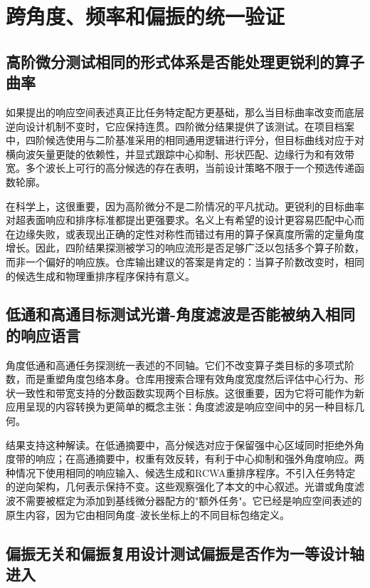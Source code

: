 \section{跨角度、频率和偏振的统一验证}

\subsection{高阶微分测试相同的形式体系是否能处理更锐利的算子曲率}

如果提出的响应空间表述真正比任务特定配方更基础，那么当目标曲率改变而底层逆向设计机制不变时，它应保持连贯。四阶微分结果提供了该测试。在项目档案中，四阶候选使用与二阶基准采用的相同通用逻辑进行评分，但目标曲线对应于对横向波矢量更陡的依赖性，并显式跟踪中心抑制、形状匹配、边缘行为和有效带宽。多个波长上可行的高分候选的存在表明，当前设计策略不限于一个预选传递函数轮廓。

在科学上，这很重要，因为高阶微分不是二阶情况的平凡扰动。更锐利的目标曲率对超表面响应和排序标准都提出更强要求。名义上有希望的设计更容易匹配中心而在边缘失败，或表现出正确的定性对称性而错过有用的算子保真度所需的定量角度增长。因此，四阶结果探测被学习的响应流形是否足够广泛以包括多个算子阶数，而非一个偏好的响应族。仓库输出建议的答案是肯定的：当算子阶数改变时，相同的候选生成和物理重排序程序保持有意义。

\subsection{低通和高通目标测试光谱-角度滤波是否能被纳入相同的响应语言}

角度低通和高通任务探测统一表述的不同轴。它们不改变算子类目标的多项式阶数，而是重塑角度包络本身。仓库用搜索合理有效角度宽度然后评估中心行为、形状一致性和带宽支持的分数函数实现两个目标族。这很重要，因为它将可能作为新应用呈现的内容转换为更简单的概念主张：角度滤波是响应空间中的另一种目标几何。

结果支持这种解读。在低通摘要中，高分候选对应于保留强中心区域同时拒绝外角度带的响应；在高通摘要中，权重有效反转，有利于中心抑制和强外角度响应。两种情况下使用相同的响应输入、候选生成和RCWA重排序程序。不引入任务特定的逆向架构，几何表示保持不变。这些观察强化了本文的中心叙述。光谱或角度滤波不需要被框定为添加到基线微分器配方的"额外任务"。它已经是响应空间表述的原生内容，因为它由相同角度--波长坐标上的不同目标包络定义。

\subsection{偏振无关和偏振复用设计测试偏振是否作为一等设计轴进入}

